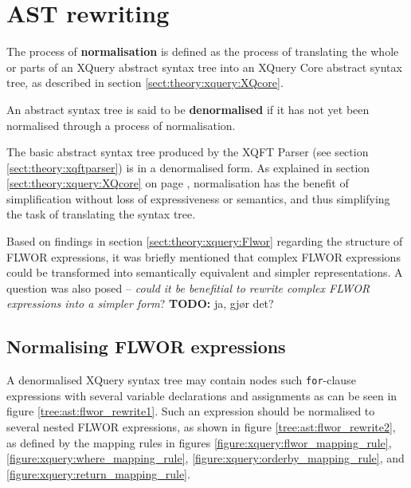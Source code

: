 \section{AST rewriting}
\label{sect:method:ast_rewrite}
\begin{myDefinition}
\label{definition:normalisation}
The process of \textbf{normalisation} is defined as the process of translating the
whole or parts of an XQuery abstract syntax tree into an XQuery Core abstract
syntax tree, as described in section \ref{sect:theory:xquery:XQcore}.
\end{myDefinition}

\begin{myDefinition}
\label{definition:denormalised}
An abstract syntax tree is said to be \textbf{denormalised} if it has not yet
been normalised through a process of normalisation.
\end{myDefinition}

The basic abstract syntax tree produced by the XQFT Parser (see section
\ref{sect:theory:xqftparser}) is in a denormalised form. As explained in
section \ref{sect:theory:xquery:XQcore} on page
\pageref{sect:theory:xquery:XQcore}, normalisation has the benefit of
simplification without loss of expressiveness or semantics, and thus
simplifying the task of translating the syntax tree.

Based on findings in section \ref{sect:theory:xquery:Flwor} regarding the
structure of FLWOR expressions, it was briefly mentioned that complex FLWOR
expressions could be transformed into semantically equivalent and simpler
representations. A question was also posed --\emph{ could it be
benefitial to rewrite complex FLWOR expressions into a simpler form}? \textbf{\LARGE TODO:} ja, gj\o r det?

\subsection{Normalising FLWOR expressions}
A denormalised XQuery syntax tree may contain nodes such \texttt{for}-clause expressions with several variable
declarations and assignments as can be seen in figure \ref{tree:ast:flwor_rewrite1}. Such an expression should be
normalised to several nested FLWOR expressions, as shown in figure \ref{tree:ast:flwor_rewrite2}, as defined by
the mapping rules in figures \ref{figure:xquery:flwor_mapping_rule},
\ref{figure:xquery:where_mapping_rule},
\ref{figure:xquery:orderby_mapping_rule}, and
\ref{figure:xquery:return_mapping_rule}.

